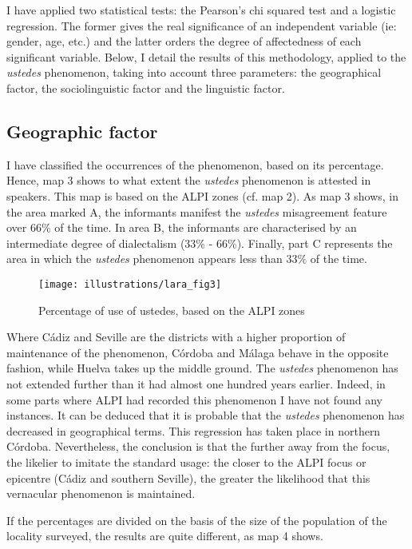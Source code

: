 \documentclass[output=paper]{LSP/langsci}
\begin{document}
I have applied two statistical tests: the Pearson’s chi squared test and a logistic regression. The former gives the real significance of an independent variable (ie: gender, age, etc.) and the latter orders the degree of affectedness of each significant variable. Below, I detail the results of this methodology, applied to the \textit{ustedes} phenomenon, taking into account three parameters: the geographical factor, the sociolinguistic factor and the linguistic factor.

\subsection{Geographic factor}
I have classified the occurrences of the phenomenon, based on its percentage. Hence, map 3 shows to what extent the \textit{ustedes} phenomenon is attested in speakers. This map is based on the ALPI zones (cf. map 2). As map 3 shows, in the area marked A, the informants manifest the \textit{ustedes} misagreement feature over 66\% of the time. In area B, the informants are characterised by an intermediate degree of dialectalism (33\% - 66\%). Finally, part C represents the area in which the \textit{ustedes} phenomenon appears less than 33\% of the time. 

\begin{figure}
\texttt{[image: illustrations/lara\_fig3]}
\label{fig:3}
\caption{Percentage of use of ustedes, based on the ALPI zones}
\end{figure}

Where Cádiz and Seville are the districts with a higher proportion of maintenance of the phenomenon, Córdoba and Málaga behave in the opposite fashion, while Huelva takes up the middle ground. The \textit{ustedes} phenomenon has not extended further than it had almost one hundred years earlier. Indeed, in some parts where ALPI had recorded this phenomenon I have not found any instances. It can be deduced that it is probable that the \textit{ustedes} phenomenon has decreased in geographical terms. This regression has taken place in northern Córdoba. Nevertheless, the conclusion is that the further away from the focus, the likelier to imitate the standard usage: the closer to the ALPI focus or epicentre (Cádiz and southern Seville), the greater the likelihood that this vernacular phenomenon is maintained. 

If the percentages are divided on the basis of the size of the population of the locality surveyed, the results are quite different, as map 4 shows.
\end{document}
